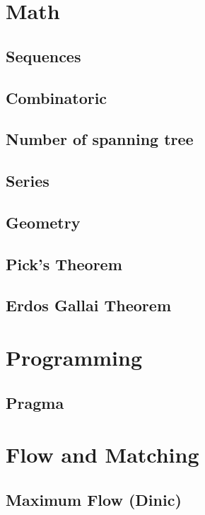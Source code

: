 \section{Math}
\subsection{Sequences}

\subsection{Combinatoric}

\subsection{Number of spanning tree}

\subsection{Series}

\subsection{Geometry}

\subsection{Pick's Theorem}

\subsection{Erdos Gallai Theorem}


\section{Programming}
\subsection{Pragma}
\raggedbottom
\hrulefill

\section{Flow and Matching}
\subsection{Maximum Flow (Dinic)}
\raggedbottom
\hrulefill
